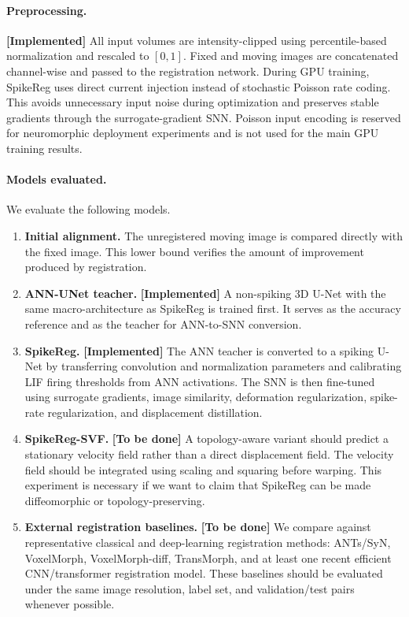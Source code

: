 \paragraph{Preprocessing.}
\textbf{[Implemented]} All input volumes are intensity-clipped using percentile-based normalization and rescaled to \([0,1]\). Fixed and moving images are concatenated channel-wise and passed to the registration network. During GPU training, SpikeReg uses direct current injection instead of stochastic Poisson rate coding. This avoids unnecessary input noise during optimization and preserves stable gradients through the surrogate-gradient SNN. Poisson input encoding is reserved for neuromorphic deployment experiments and is not used for the main GPU training results.

\paragraph{Models evaluated.}
We evaluate the following models.

\begin{enumerate}
    \item \textbf{Initial alignment.} The unregistered moving image is compared directly with the fixed image. This lower bound verifies the amount of improvement produced by registration.
    
    \item \textbf{ANN-UNet teacher.} \textbf{[Implemented]} A non-spiking 3D U-Net with the same macro-architecture as SpikeReg is trained first. It serves as the accuracy reference and as the teacher for ANN-to-SNN conversion.
    
    \item \textbf{SpikeReg.} \textbf{[Implemented]} The ANN teacher is converted to a spiking U-Net by transferring convolution and normalization parameters and calibrating LIF firing thresholds from ANN activations. The SNN is then fine-tuned using surrogate gradients, image similarity, deformation regularization, spike-rate regularization, and displacement distillation.
    
    \item \textbf{SpikeReg-SVF.} \textbf{[To be done]} A topology-aware variant should predict a stationary velocity field rather than a direct displacement field. The velocity field should be integrated using scaling and squaring before warping. This experiment is necessary if we want to claim that SpikeReg can be made diffeomorphic or topology-preserving.
    
    \item \textbf{External registration baselines.} \textbf{[To be done]} We compare against representative classical and deep-learning registration methods: ANTs/SyN, VoxelMorph, VoxelMorph-diff, TransMorph, and at least one recent efficient CNN/transformer registration model. These baselines should be evaluated under the same image resolution, label set, and validation/test pairs whenever possible.
\end{enumerate}

